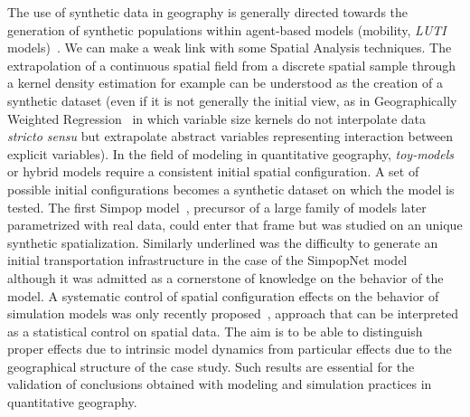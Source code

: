 The use of synthetic data in geography is generally directed towards the generation of synthetic populations within agent-based models (mobility, \emph{LUTI} models)~\cite{pritchard2009advances}. We can make a weak link with some Spatial Analysis techniques. The extrapolation of a continuous spatial field from a discrete spatial sample through a kernel density estimation for example can be understood as the creation of a synthetic dataset (even if it is not generally the initial view, as in Geographically Weighted Regression~\cite{brunsdon1998geographically} in which variable size kernels do not interpolate data \emph{stricto sensu} but extrapolate abstract variables representing interaction between explicit variables). In the field of modeling in quantitative geography, \emph{toy-models} or hybrid models require a consistent initial spatial configuration. A set of possible initial configurations becomes a synthetic dataset on which the model is tested. The first Simpop model~\cite{sanders1997simpop}, precursor of a large family of models later parametrized with real data, could enter that frame but was studied on an unique synthetic spatialization. Similarly underlined was the difficulty to generate an initial transportation infrastructure in the case of the SimpopNet model~\cite{schmitt2014modelisation} although it was admitted as a cornerstone of knowledge on the behavior of the model. A systematic control of spatial configuration effects on the behavior of simulation models was only recently proposed~\cite{cottineau2015revisiting}, approach that can be interpreted as a statistical control on spatial data. The aim is to be able to distinguish proper effects due to intrinsic model dynamics from particular effects due to the geographical structure of the case study. Such results are essential for the validation of conclusions obtained with modeling and simulation practices in quantitative geography.


